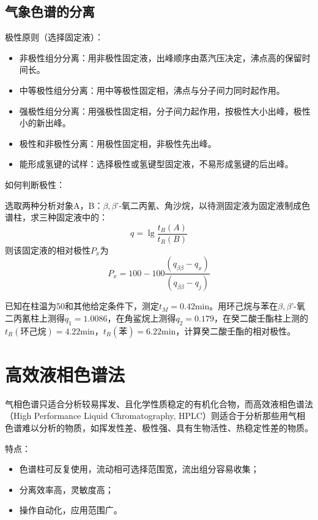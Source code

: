 \subsection{气象色谱的分离}
极性原则（选择固定液）：
\begin{itemize}
	\item 非极性组分分离：用非极性固定液，出峰顺序由蒸汽压决定，沸点高的保留时间长。
	\item 中等极性组分分离：用中等极性固定相，沸点与分子间力同时起作用。
	\item 强极性组分分离：用强极性固定相，分子间力起作用，按极性大小出峰，极性小的新出峰。
	\item 极性和非极性分离：用极性固定相，非极性先出峰。
	\item 能形成氢键的试样：选择极性或氢键型固定液，不易形成氢键的后出峰。
\end{itemize}

如何判断极性：

选取两种分析对象A，B：$\beta,\beta’$-氧二丙氰、角沙烷，以待测固定液为固定液制成色谱柱，求三种固定液中的：
\begin{equation*}
	q=\lg⁡\dfrac{t_R (A)}{t_R (B)}
\end{equation*}
则该固定液的相对极性$P_x$为
\begin{equation*}
	P_x=100-100 \dfrac{(q_{\beta\beta}-q_x)}{(q_{\beta\beta}-q_j)}
\end{equation*}

\begin{example}
	已知在柱温为50\textcelsius 和其他给定条件下，测定$t_M=0.42$min。用环己烷与苯在$\beta,\beta’$-氧二丙氰柱上测得$q_1=1.0086$，在角鲨烷上测得$q_2=0.179$，在癸二酸壬酯柱上测的$t_R(\text{环己烷})=4.22$min，$t_R(\text{苯})=6.22$min，计算癸二酸壬酯的相对极性。
\end{example}

\section{高效液相色谱法}

气相色谱只适合分析较易挥发、且化学性质稳定的有机化合物，而高效液相色谱法（High Performance Liquid Chromatography, HPLC）则适合于分析那些用气相色谱难以分析的物质，如挥发性差、极性强、具有生物活性、热稳定性差的物质。

特点：
\begin{itemize}
	\item 色谱柱可反复使用，流动相可选择范围宽，流出组分容易收集；
	\item 分离效率高，灵敏度高；
	\item 操作自动化，应用范围广。
\end{itemize}

